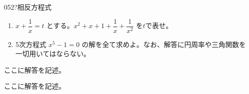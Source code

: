 \begin{thm}{052}{\hosi ?}{相反方程式}
 \begin{enumerate}
  \item $x+\dfrac{1}{x}=t$ とする。$x^2+x+1+\dfrac{1}{x}+\dfrac{1}{x^2}$ を$t$で表せ。
  \item 5次方程式 $x^5-1=0$ の解を全て求めよ。なお、解答に円周率や三角関数を一切用いてはならない。
 \end{enumerate}
\end{thm}

ここに解答を記述。

ここに解答を記述。